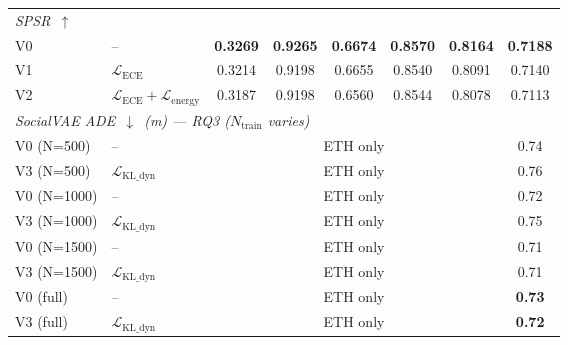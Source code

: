 \begin{table}[t]
{\begin{tabular}{l l c c c c c | c}
\midrule
\multicolumn{8}{l}{\textit{SPSR~$\uparrow$}} \\
V0 & -- & \textbf{0.3269} & \textbf{0.9265} & \textbf{0.6674} & \textbf{0.8570} & \textbf{0.8164} & \textbf{0.7188} \\
V1 & $\mathcal{L}_{\text{ECE}}$ & 0.3214 & 0.9198 & 0.6655 & 0.8540 & 0.8091 & 0.7140 \\
V2 & $\mathcal{L}_{\text{ECE}}+\mathcal{L}_{\text{energy}}$ & 0.3187 & 0.9198 & 0.6560 & 0.8544 & 0.8078 & 0.7113 \\
\midrule
\multicolumn{8}{l}{\textit{SocialVAE ADE~$\downarrow$~(m) — RQ3 ($N_{\text{train}}$ varies)}} \\
V0 (N=500)  & -- & \multicolumn{5}{c}{ETH only} & 0.74 \\
V3 (N=500)  & $\mathcal{L}_{\text{KL\_dyn}}$ & \multicolumn{5}{c}{ETH only} & 0.76 \\
V0 (N=1000) & -- & \multicolumn{5}{c}{ETH only} & 0.72 \\
V3 (N=1000) & $\mathcal{L}_{\text{KL\_dyn}}$ & \multicolumn{5}{c}{ETH only} & 0.75 \\
V0 (N=1500) & -- & \multicolumn{5}{c}{ETH only} & 0.71 \\
V3 (N=1500) & $\mathcal{L}_{\text{KL\_dyn}}$ & \multicolumn{5}{c}{ETH only} & 0.71 \\
V0 (full)   & -- & \multicolumn{5}{c}{ETH only} & \textbf{0.73} \\
V3 (full)   & $\mathcal{L}_{\text{KL\_dyn}}$ & \multicolumn{5}{c}{ETH only} & \textbf{0.72} \\
\bottomrule
\end{tabular}%
}
\end{table}